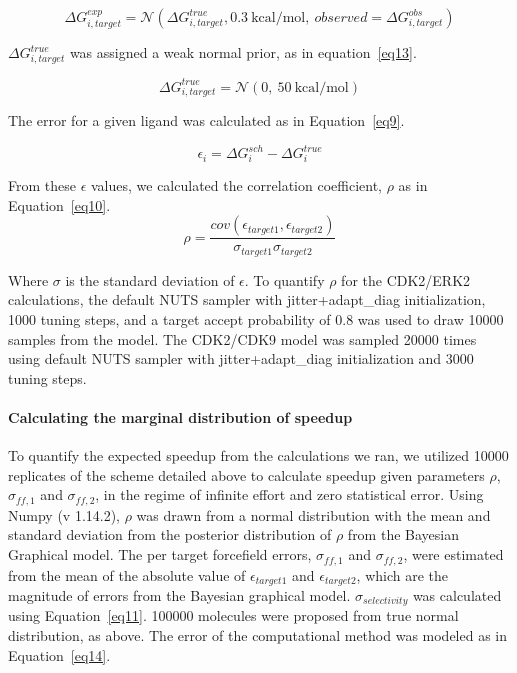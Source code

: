 \documentclass[9pt,lineno]{elife-modified} %
\begin{document}
\begin{equation}\label{eq12}
\Delta G^{exp}_{i,target} = \mathcal{N}(\Delta G^{true}_{i,target}, 0.3 ~\text{kcal/mol},~observed = \Delta G^{obs}_{i,target})
\end{equation}

$\Delta G^{true}_{i,target}$ was assigned a weak normal prior, as in equation~\ref{eq13}. 

\begin{equation}\label{eq13}
\Delta G^{true}_{i,target} = \mathcal{N}(0, ~50~\text{kcal/mol})
\end{equation}

The error for a given ligand was calculated as in Equation~\ref{eq9}. 

\begin{equation}\label{eq9}
\epsilon_i = \Delta G^{sch}_i - \Delta G^{true}_i
\end{equation}

From these $\epsilon$ values, we calculated the correlation coefficient, $\rho$ as in Equation~\ref{eq10}. 
\begin{equation}\label{eq10}
\rho = \frac{cov(\epsilon_{target1}, \epsilon_{target2})}{\sigma_{target 1}\sigma_{target 2}}
\end{equation}
 
 Where $\sigma$ is the standard deviation of $\epsilon$. To quantify $\rho$ for the CDK2/ERK2 calculations, the default NUTS sampler with jitter+adapt\_diag initialization, 1000 tuning steps, and a target accept probability of 0.8 was used to draw 10000 samples from the model. The CDK2/CDK9 model was sampled 20000 times using default NUTS sampler with jitter+adapt\_diag initialization and 3000 tuning steps. 
 
 \paragraph{Calculating the marginal distribution of speedup}
 
 To quantify the expected speedup from the calculations we ran, we utilized 10000 replicates of the scheme detailed above to calculate speedup given parameters $\rho$, $\sigma_{ff,1}$ and $\sigma_{ff,2}$, in the regime of infinite effort and zero statistical error. Using Numpy (v 1.14.2), $\rho$ was drawn from a normal distribution with the mean and standard deviation from the posterior distribution of $\rho$ from the Bayesian Graphical model. The per target forcefield errors, $\sigma_{ff,1}$ and $\sigma_{ff,2}$, were estimated from the mean of the absolute value of  $\epsilon_{target1}$ and $\epsilon_{target2}$, which are the magnitude of errors from the Bayesian graphical model. $\sigma_{selectivity}$ was calculated using Equation~\ref{eq11}. 100000 molecules were proposed from true normal distribution, as above. The error of the computational method was modeled as in Equation~\ref{eq14}. 
 
\end{document}
